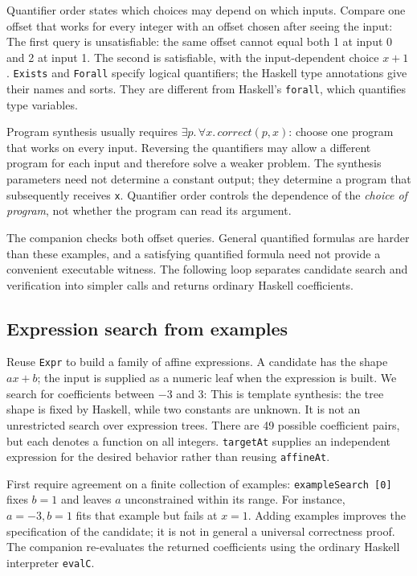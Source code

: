 \documentclass[review]{jfp-epi}
\newcommand{\code}[1]{\texttt{#1}}
\begin{document}
Quantifier order states which choices may depend on which inputs. Compare one
offset that works for every integer with an offset chosen after seeing the input:
The first query is unsatisfiable: the same offset cannot equal both 1 at input
0 and 2 at input 1. The second is satisfiable, with the input-dependent choice
$x+1$. \code{Exists} and \code{Forall} specify logical quantifiers; the Haskell
type annotations give their names and sorts. They are different from Haskell's
\code{forall}, which quantifies type variables.

Program synthesis usually requires $\exists p.\,\forall x.\,\mathit{correct}(p,x)$:
choose one program that works on every input. Reversing the quantifiers may
allow a different program for each input and therefore solve a weaker problem.
The synthesis parameters need not determine a constant output; they determine
a program that subsequently receives \code{x}. Quantifier order controls the
dependence of the \emph{choice of program}, not whether the program can read
its argument.

The companion checks both offset queries. General quantified formulas are harder
than these examples, and a satisfying quantified formula need not provide a
convenient executable witness. The following loop separates candidate search
and verification into simpler calls and returns ordinary Haskell coefficients.


\subsection{Expression search from examples}
\label{sec:expression-search}

Reuse \code{Expr} to build a family of affine expressions. A candidate has the
shape $a x+b$; the input is supplied as a numeric leaf when the expression is
built. We search for coefficients between $-3$ and 3:
This is template synthesis: the tree shape is fixed by Haskell, while two
constants are unknown. It is not an unrestricted search over expression trees.
There are 49 possible coefficient pairs, but each denotes a function on all
integers. \code{targetAt} supplies an independent expression for the desired
behavior rather than reusing \code{affineAt}.

First require agreement on a finite collection of examples:
\code{exampleSearch [0]} fixes $b=1$ and leaves $a$ unconstrained within its
range. For instance, $a=-3,b=1$ fits that example but fails at $x=1$.
Adding examples improves the specification of the candidate; it is not in
general a universal correctness proof. The companion re-evaluates the returned
coefficients using the ordinary Haskell interpreter \code{evalC}.
\end{document}
